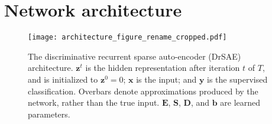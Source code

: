 \documentclass{article} %
\newcommand{\bv}{\mathbf{b}}
\newcommand{\hid}{\mathbf{z}}
\newcommand{\inp}{\mathbf{x}}
\newcommand{\out}{y}
\newcommand{\D}{\mathbf{D}}
\newcommand{\E}{\mathbf{E}}
\newcommand{\Sm}{\mathbf{S}}
\begin{document}
\begin{comment}
Unlike contractive autoencoders \citep{rifai2011a} or tangent propagation \citep{simard1993}, the selected prototype is represented explicitly, facilitating natural and accurate classification.  This is potentially useful, in datapoints belonging to different classes may be composed of a common set of parts.  Indeed, it is often the case that the manifolds corresponding to two different classes touch.  For instance, it is possible to continuously deform a 4 into a 9 while remaining on the data manifold.  The tangent distance provides a consistent and intuitive way to deal with ambiguous points near the intersection of two manifolds.  Tangent propagation alone provides no a priori information about how to deal with these points.  Just as contractive autoencoders extend tangent propagation by requiring that the input distribution be modeled while minimizing the volatility of the output in all directions (and thus certainly in directions of allowed deformations), our networks induce the usage of a particularly natural and informative hidden representation.  
\end{comment}



\section{Network architecture}

\begin{figure}[tb]
  \begin{center}
    \texttt{[image: architecture\_figure\_rename\_cropped.pdf]}
  \end{center}
  \caption{The discriminative recurrent sparse auto-encoder (DrSAE) architecture.  $\hid^t$ is the hidden representation after iteration $t$ of $T$, and is initialized to $\hid^0 = 0$; $\inp$ is the input; and $\mathbf{\out}$ is the supervised classification.  Overbars denote approximations produced by the network, rather than the true input.  $\E$, $\Sm$, $\D$, and $\bv$ are learned parameters.  \label{architecture_figure}} 
\end{figure}

\end{document}
